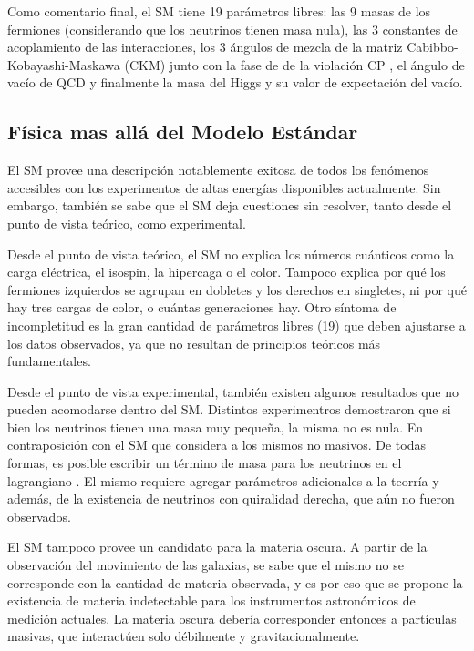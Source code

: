 Como comentario final, el SM tiene 19 parámetros libres: las 9 masas de los fermiones (considerando que los neutrinos tienen masa nula), las 3 constantes de acoplamiento de las interacciones, los 3 ángulos de mezcla de la matriz Cabibbo-Kobayashi-Maskawa (CKM) junto con la fase de de la violación CP , el ángulo de vacío de QCD y finalmente la masa del Higgs y su valor de expectación del vacío.


\subsection{Física mas allá del Modelo Estándar}

El SM provee una descripción notablemente exitosa de todos los fenómenos accesibles con los experimentos de altas energías disponibles actualmente. Sin embargo, también se sabe que el SM deja cuestiones sin resolver, tanto desde el punto de vista teórico, como experimental.

Desde el punto de vista teórico, el SM no explica los números cuánticos como la carga eléctrica, el isospin, la hipercaga o el color. Tampoco explica por qué los fermiones izquierdos se agrupan en dobletes y los derechos en singletes, ni por qué hay tres cargas de color, o cuántas generaciones hay. Otro síntoma de incompletitud es la gran cantidad de parámetros libres (19) que deben ajustarse a los datos observados, ya que no resultan de principios teóricos más fundamentales.

Desde el punto de vista experimental, también existen algunos resultados que no pueden acomodarse dentro del SM. Distintos experimentros demostraron que si bien los neutrinos tienen una masa muy pequeña, la misma no es nula. En contraposición con el SM que considera a los mismos no masivos. De todas formas, es posible escribir un término de masa para los neutrinos en el lagrangiano . El mismo requiere agregar parámetros adicionales a la teorría y además, de la existencia de neutrinos con quiralidad derecha, que aún no fueron observados.

El SM tampoco provee un candidato para la materia oscura. A partir de la observación del movimiento de las galaxias, se sabe que el mismo no se corresponde con la cantidad de materia observada, y es por eso que se propone la existencia de materia indetectable para los instrumentos astronómicos de medición actuales. La materia oscura debería corresponder entonces a partículas masivas, que interactúen solo débilmente y gravitacionalmente.

